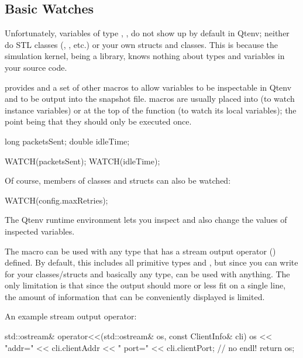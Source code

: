 \subsection{Basic Watches}
\label{sec:sim-lib:basic-watches}

Unfortunately, variables of type , , 
do not show up by default in Qtenv; neither do STL classes
(, , etc.) or your own structs and
classes. This is because the simulation kernel, being a library, knows
nothing about types and variables in your source code.

{\opp} provides  and a set of other macros to
allow variables to be inspectable in Qtenv and to be output into the snapshot
file.  macros are usually placed into
 (to watch instance variables) or at the top of the
 function (to watch its local variables); the point being
that they should only be executed once.

\begin{cpp}
long packetsSent;
double idleTime;

WATCH(packetsSent);
WATCH(idleTime);
\end{cpp}

Of course, members of classes and structs can also be watched:

\begin{cpp}
WATCH(config.maxRetries);
\end{cpp}

The Qtenv runtime environment lets you inspect and also change
the values of inspected variables.

The  macro can be used with any type that has a
stream output operator () defined. By default,
this includes all primitive types and , but since
you can write  for your classes/structs and basically
any type,  can be used with anything. The only limitation
is that since the output should more or less fit on a single line, the
amount of information that can be conveniently displayed is limited.

An example stream output operator:

\begin{cpp}
std::ostream& operator<<(std::ostream& os, const ClientInfo& cli)
{
    os << "addr=" << cli.clientAddr << "  port=" << cli.clientPort; // no endl!
    return os;
}
\end{cpp}

